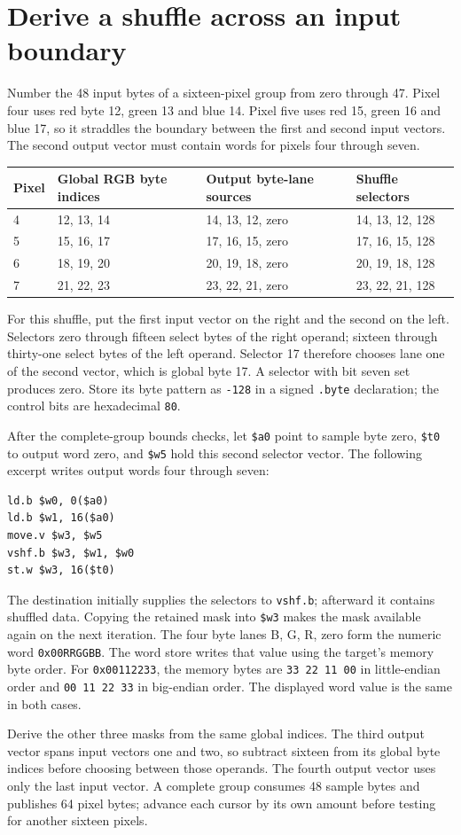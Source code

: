 \section{Derive a shuffle across an input boundary}
Number the 48 input bytes of a sixteen-pixel group from zero through 47. Pixel four
uses red byte 12, green 13 and blue 14. Pixel five uses red 15, green 16 and blue 17,
so it straddles the boundary between the first and second input vectors. The second
output vector must contain words for pixels four through seven.

\begin{longtable}{p{24mm}p{42mm}p{35mm}p{44mm}}
\toprule Pixel & Global RGB byte indices & Output byte-lane sources & Shuffle selectors \\\midrule
4 & 12, 13, 14 & 14, 13, 12, zero & 14, 13, 12, 128 \\
5 & 15, 16, 17 & 17, 16, 15, zero & 17, 16, 15, 128 \\
6 & 18, 19, 20 & 20, 19, 18, zero & 20, 19, 18, 128 \\
7 & 21, 22, 23 & 23, 22, 21, zero & 23, 22, 21, 128 \\\bottomrule
\end{longtable}
For this shuffle, put the first input vector on the right and the second on the
left. Selectors zero through fifteen select bytes of the right operand; sixteen
through thirty-one select bytes of the left operand. Selector 17 therefore chooses
lane one of the second vector, which is global byte 17. A selector with bit seven
set produces zero. Store its byte pattern as \texttt{-128} in a signed
\texttt{.byte} declaration; the control bits are hexadecimal \texttt{80}.

After the complete-group bounds checks, let \texttt{\$a0} point to sample byte zero,
\texttt{\$t0} to output word zero, and \texttt{\$w5} hold this second selector vector.
The following excerpt writes output words four through seven:
\begin{verbatim}
ld.b $w0, 0($a0)
ld.b $w1, 16($a0)
move.v $w3, $w5
vshf.b $w3, $w1, $w0
st.w $w3, 16($t0)
\end{verbatim}
The destination initially supplies the selectors to \texttt{vshf.b}; afterward it
contains shuffled data. Copying the retained mask into \texttt{\$w3} makes the mask
available again on the next iteration. The four byte lanes B, G, R, zero form the
numeric word \texttt{0x00RRGGBB}. The word store writes that value using the target's
memory byte order. For \texttt{0x00112233}, the memory bytes are
\texttt{33 22 11 00} in little-endian order and \texttt{00 11 22 33} in big-endian
order. The displayed word value is the same in both cases.

Derive the other three masks from the same global indices. The third output vector
spans input vectors one and two, so subtract sixteen from its global byte indices
before choosing between those operands. The fourth output vector uses only the last
input vector. A complete group consumes 48 sample bytes and publishes 64 pixel bytes;
advance each cursor by its own amount before testing for another sixteen pixels.

